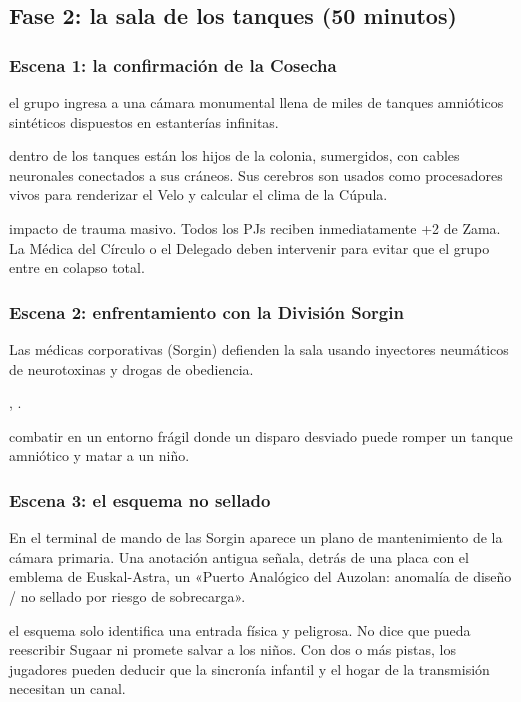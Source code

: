\subsection{Fase 2: la sala de los tanques (50 minutos)}

\subsubsection{Escena 1: la confirmación de la Cosecha}
 el grupo ingresa a una cámara monumental llena de miles de tanques amnióticos sintéticos dispuestos en estanterías infinitas.\par
{} dentro de los tanques están los hijos de la colonia, sumergidos, con cables neuronales conectados a sus cráneos. Sus cerebros son usados como procesadores vivos para renderizar el Velo y calcular el clima de la Cúpula.\par
{} impacto de trauma masivo. Todos los PJs reciben inmediatamente +2 de Zama. La Médica del Círculo o el Delegado deben intervenir para evitar que el grupo entre en colapso total.

\subsubsection{Escena 2: enfrentamiento con la División Sorgin}
Las médicas corporativas (Sorgin) defienden la sala usando inyectores neumáticos de neurotoxinas y drogas de obediencia.\par
{} , .\par
{} combatir en un entorno frágil donde un disparo desviado puede romper un tanque amniótico y matar a un niño.

\subsubsection{Escena 3: el esquema no sellado}
En el terminal de mando de las Sorgin aparece un plano de mantenimiento de la cámara primaria. Una anotación antigua señala, detrás de una placa con el emblema de Euskal-Astra, un «Puerto Analógico del Auzolan: anomalía de diseño / no sellado por riesgo de sobrecarga».\par
{} el esquema solo identifica una entrada física y peligrosa. No dice que pueda reescribir Sugaar ni promete salvar a los niños. Con dos o más pistas, los jugadores pueden deducir que la sincronía infantil y el hogar de la transmisión necesitan un canal.

